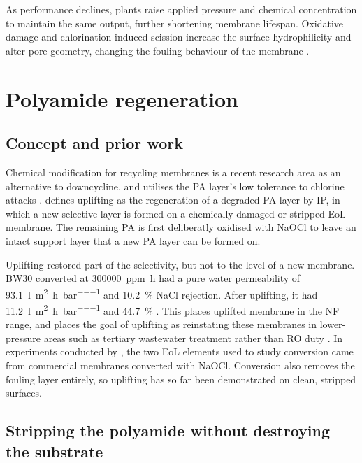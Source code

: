 As performance declines, plants raise applied pressure and chemical concentration to maintain the same output, further shortening membrane lifespan. Oxidative damage and chlorination-induced scission increase the surface hydrophilicity and alter pore geometry, changing the fouling behaviour of the membrane \citep{Molinaa2018,Kwon2006a}.


\section{Polyamide regeneration}
\label{sec:uplifting}

\subsection{Concept and prior work}
\label{sec:uplifting-concept}
Chemical modification for recycling membranes is a recent research area as an alternative to downcycline, and utilises the PA layer's low tolerance to chlorine attacks \citep{GarciaPacheco2015}. \citet{Ogbe2025} defines uplifting as the regeneration of a degraded PA layer by IP, in which a new selective layer is formed on a chemically damaged or stripped EoL membrane. The remaining PA is first deliberatly oxidised with NaOCl to leave an intact support layer that a new PA layer can be formed on.

Uplifting restored part of the selectivity, but not to the level of a new membrane. BW30 converted at \qty{300000}{ppm.h} had a pure water permeability of \qty{93.1}{\litre\per\square\metre\per\hour\per\bar} and \qty{10.2}{\percent} NaCl rejection. After uplifting, it had \qty{11.2}{\litre\per\square\metre\per\hour\per\bar} and \qty{44.7}{\percent} \citep{Ogbe2025}. This places uplifted membrane in the NF range, and places the goal of uplifting as reinstating these membranes in lower-pressure areas such as tertiary wastewater treatment rather than RO duty \citep{Ogbe2025}. In experiments conducted by \citet{Ogbe2025}, the two EoL elements used to study conversion came from commercial membranes converted with NaOCl. Conversion also removes the fouling layer entirely, so uplifting has so far been demonstrated on clean, stripped surfaces. 




\subsection{Stripping the polyamide without destroying the substrate}
\label{sec:pa-removal}

